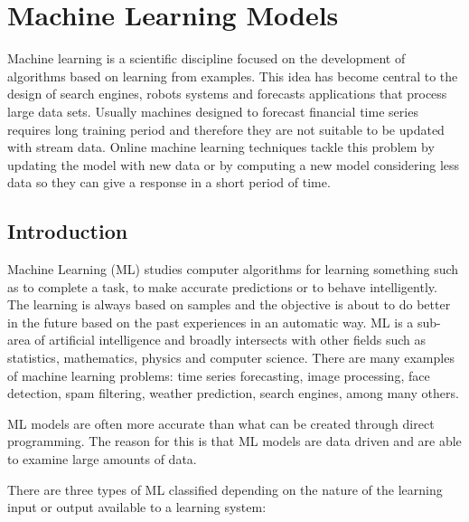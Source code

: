 \chapter{Machine Learning Models}
\label{chapter:MLM}
Machine learning is a scientific discipline focused on the development of
algorithms based on learning from examples. This idea has become central to the
design of search engines, robots systems and forecasts applications that process
large data sets. Usually machines designed to forecast financial time series
requires long training period and therefore they are not suitable to be updated
with stream data. Online machine learning techniques tackle this problem by
updating the model with new data or by computing a new model considering less data so
they can give a response in a short period of time.

\vspace{0.5cm} 

\section{Introduction}
Machine Learning (ML) studies computer algorithms for learning something such as
to complete a task, to make accurate predictions or to behave intelligently. The
learning is always based on samples and the objective is about to do better in
the future based on the past experiences in an automatic way. ML is a sub-area
of artificial intelligence and broadly intersects with other fields such as
statistics, mathematics, physics and computer science.  There are many examples
of machine learning problems: time series forecasting, image processing, face
detection, spam filtering, weather prediction, search engines, among many
others.

ML models are often more accurate than what can be created through direct
programming. The reason for this is that ML models are data driven and are able
to examine large amounts of data.

There are three types of ML classified depending on the nature of the learning
input or output available to a learning system:

